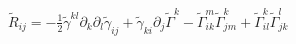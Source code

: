 $
\tilde{R}_{ij} = -\frac{1}{2} \tilde{\gamma}^{kl} \partial_k \partial_l \tilde{\gamma}_{ij} + \tilde{\gamma}_{ki} \partial_j \tilde{\Gamma}^k - \tilde{\Gamma}^m_{ik} \tilde{\Gamma}^k_{jm} + \tilde{\Gamma}^k_{il} \tilde{\Gamma}^l_{jk}
$


